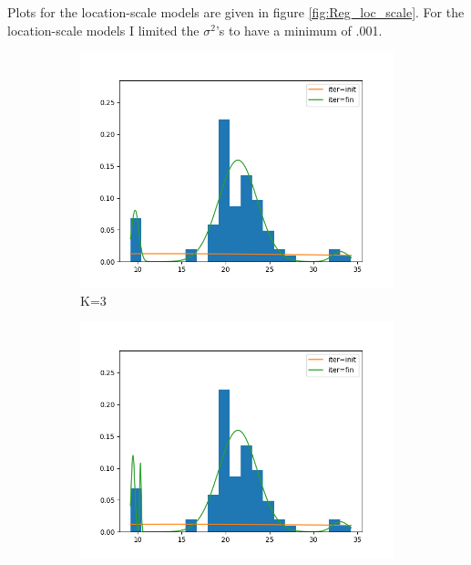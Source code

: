 Plots for the location-scale models are given in figure \ref{fig:Reg_loc_scale}.
For the location-scale models I limited the $\sigma^2$'s to have a minimum of .001.

\begin{figure}
     \centering
     \begin{subfigure}[b]{0.3\textwidth}
         \centering
         \includegraphics[width=\textwidth]{../code/regular_loc_scale_plots/galaxies_hist_k_3.png}
         \caption{K=3}
         \label{fig:Reg_loc_scale3}
     \end{subfigure}
     \hfill
     \begin{subfigure}[b]{0.3\textwidth}
         \centering
         \includegraphics[width=\textwidth]{../code/regular_loc_scale_plots/galaxies_hist_k_4.png}

\end{subfigure}
\end{figure}
